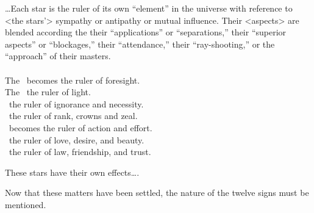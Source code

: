 \mnm[0.2cm]
\ldots Each star is the ruler of its own “element” in the universe with reference to <the stars’> sympathy or
antipathy or mutual influence. Their <aspects> are blended according the their “applications” or
“separations,” their “superior aspects” or “blockages,” their “attendance,” their “ray-shooting,” or the
“approach” of their masters. \\
\\
The \Moon\,  becomes the ruler of foresight. \\
The \Sun\,  the ruler of light. \\
\Saturn\,  the ruler of ignorance and necessity. \\
\Jupiter\, the ruler of rank, crowns and zeal. \\
\Mars\, becomes the ruler of action and effort. \\
\Venus\, the ruler of love, desire, and beauty. \\
\Mercury\,  the ruler of law, friendship, and trust. 

These stars have their own effects\ldots.

Now that these matters have been settled, the nature of the twelve signs must be mentioned.
\newpage